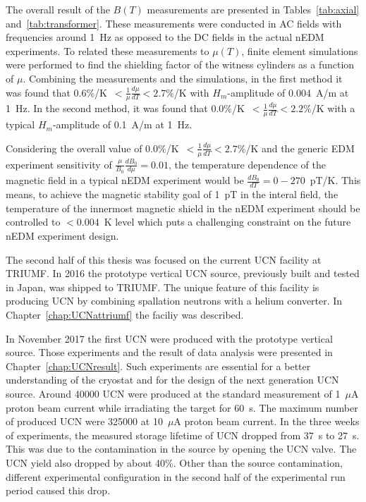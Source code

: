 The overall result of the $B(T)$ measurements are presented in
Tables~\ref{tab:axial} and~\ref{tab:transformer}. These measurements
were conducted in AC fields with frequencies around 1~Hz as opposed to
the DC fields in the actual nEDM experiments.  To related these
measurements to $\mu(T)$, finite element simulations were performed to
find the shielding factor of the witness cylinders as a function of
$\mu$. Combining the measurements and the simulations, in the first
method it was found that
0.6\%/K~$<\frac{1}{\mu}\frac{d\mu}{dT}<2.7\%$/K with $H_m$-amplitude
of 0.004~A/m at 1~Hz. In the second method, it was found that
0.0\%/K~$<\frac{1}{\mu}\frac{d\mu}{dT}<2.2\%$/K with a typical
$H_m$-amplitude of 0.1~A/m at 1~Hz.

Considering the overall value of
0.0\%/K~$<\frac{1}{\mu}\frac{d\mu}{dT}<2.7$\%/K and the generic EDM
experiment sensitivity of $\frac{\mu}{B_0}\frac{dB_0}{d\mu}=0.01$, the
temperature dependence of the magnetic field in a typical nEDM
experiment would be $\frac{dB_0}{dT}=0-270$~pT/K. This means, to
achieve the magnetic stability goal of 1~pT in the interal field, the
temperature of the innermost magnetic shield in the nEDM experiment
should be controlled to $<0.004$~K level which puts a challenging
constraint on the future nEDM experiment design.

The second half of this thesis was focused on the current UCN facility
at TRIUMF. In 2016 the prototype vertical UCN source, previously built
and tested in Japan, was shipped to TRIUMF. The unique feature of this
facility is producing UCN by combining spallation neutrons with a
helium converter. In Chapter~\ref{chap:UCNattriumf} the faciliy was
described.

In November 2017 the first UCN were produced with the prototype
vertical source. Those experiments and the result of data analysis
were presented in Chapter~\ref{chap:UCNresult}. Such experiments are
essential for a better understanding of the cryostat and for the
design of the next generation UCN source. Around 40000 UCN were
produced at the standard measurement of 1~$\mu$A proton beam current
while irradiating the target for 60~s. The maximum number of produced
UCN were 325000 at 10~$\mu$A proton beam current. In the three weeks
of experiments, the measured storage lifetime of UCN dropped from 37~s
to 27~s. This was due to the contamination in the source by opening
the UCN valve. The UCN yield also dropped by about 40\%. Other than
the source contamination, different experimental configuration in the
second half of the experimental run period caused this drop.








